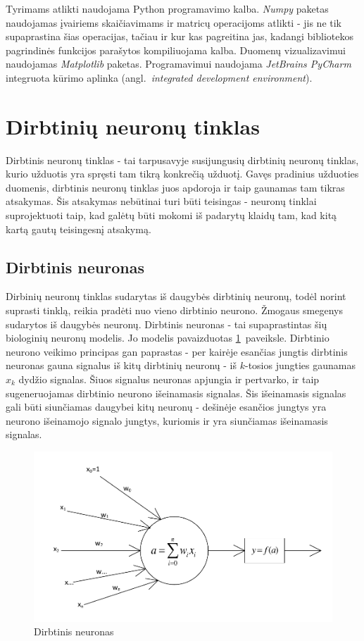 \documentclass{VUMIFPSbakalaurinis}
\begin{document}
Tyrimams atlikti naudojama Python programavimo kalba.
\textit{Numpy} paketas naudojamas įvairiems skaičiavimams ir matricų operacijoms atlikti - jis ne tik supaprastina šias operacijas, tačiau ir kur kas pagreitina jas, kadangi bibliotekos pagrindinės funkcijos parašytos kompiliuojama kalba.
Duomenų vizualizavimui naudojamas \textit{Matplotlib} paketas.
Programavimui naudojama \textit{JetBrains PyCharm} integruota kūrimo aplinka (angl.~\textit{integrated development environment}).



\section{Dirbtinių neuronų tinklas}

Dirbtinis neuronų tinklas - tai tarpusavyje susijungusių dirbtinių neuronų tinklas, kurio užduotis yra spręsti tam tikrą konkrečią užduotį.
Gavęs pradinius užduoties duomenis, dirbtinis neuronų tinklas juos apdoroja ir taip gaunamas tam tikras atsakymas.
Šis atsakymas nebūtinai turi būti teisingas - neuronų tinklai suprojektuoti taip, kad galėtų būti mokomi iš padarytų klaidų tam, kad kitą kartą gautų teisingesnį atsakymą.

\subsection{Dirbtinis neuronas}

Dirbinių neuronų tinklas sudarytas iš daugybės dirbtinių neuronų, todėl norint suprasti tinklą, reikia pradėti nuo vieno dirbtinio neurono.
Žmogaus smegenys sudarytos iš daugybės neuronų.
Dirbtinis neuronas - tai supaprastintas šių biologinių neuronų modelis.
Jo modelis pavaizduotas \ref{fig:neuron}~paveiksle.
Dirbtinio neurono veikimo principas gan paprastas - per kairėje esančias jungtis dirbtinis neuronas gauna signalus iš kitų dirbtinių neuronų - iš $k$-tosios jungties gaunamas $x_k$ dydžio signalas.
Šiuos signalus neuronas apjungia ir pertvarko, ir taip sugeneruojamas dirbtinio neurono išeinamasis signalas.
Šis išeinamasis signalas gali būti siunčiamas daugybei kitų neuronų - dešinėje esančios jungtys yra neurono išeinamojo signalo jungtys, kuriomis ir yra siunčiamas išeinamasis signalas.

\begin{figure}[h]
	\centering
	\includegraphics[scale=0.75]{diagrams/1_neuron}
	\caption{Dirbtinis neuronas}
	\label{fig:neuron}
\end{figure}
\end{document}
